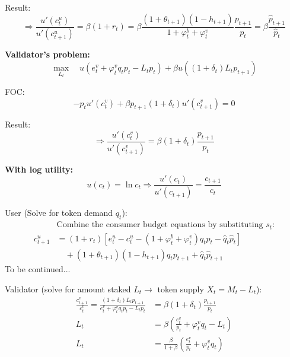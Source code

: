 \documentclass[./main.tex]{subfiles}
\begin{document}
Result:
\begin{equation}
    \Rightarrow \frac{u'(c_t^u)}{u'(c_{t+1}^u)} = \beta (1+r_t) 
    = \beta \frac{(1+\theta_{t+1})(1-h_{t+1})}{1+\varphi_t^b+\varphi_t^v} \frac{p_{t+1}}{p_t}
    = \beta \frac{\hat{p}_{t+1}}{\hat{p}_t}
\end{equation}

\noindent \textbf{Validator's problem:}
\begin{equation}
    \max_{L_t}\quad u(e_t^v + \varphi_t^v q_t p_t - L_t p_t) + \beta u((1+\delta_t) L_t p_{t+1})
\end{equation}

FOC:
\begin{equation}
    -p_t u'(c_t^v) + \beta p_{t+1} (1+\delta_t) u'(c_{t+1}^v) = 0
\end{equation}

Result:
\begin{equation}
    \Rightarrow \frac{u'(c_t^v)}{u'(c_{t+1}^v)} = \beta (1+\delta_t) \frac{p_{t+1}}{p_t}
\end{equation}

\noindent \textbf{With log utility:}
\begin{equation}
    u(c_t) = \ln c_t \Rightarrow \frac{u'(c_t)}{u'(c_{t+1})} = \frac{c_{t+1}}{c_t}
\end{equation}

User (Solve for token demand $q_t$):
\begin{align}
    &\text{Combine the consumer budget equations by substituting $s_t$:}\nonumber \\
    c_{t+1}^u &= (1+r_t) \left[e_t^u - c_t^u - (1+ \varphi_t^b+\varphi_t^v) q_t p_t - \hat{q}_t \hat{p}_t\right] \nonumber \\
    &\hspace{1em} + (1+\theta_{t+1})(1-h_{t+1}) q_t p_{t+1} + \hat{q}_t \hat{p}_{t+1}
\end{align}
To be continued...

Validator (solve for amount staked $L_t\rightarrow$ token supply $X_t=M_t-L_t$): 
\begin{align}
    \frac{c_{t+1}^v}{c_t^v} = \frac{(1+\delta_t) L_t p_{t+1}}{e_t^v + \varphi_t^v q_t p_t - L_t p_t} &= \beta (1+\delta_t) \frac{p_{t+1}}{p_t}\\
    L_t &= \beta (\frac{e_t^v}{p_t} + \varphi_t^v q_t - L_t)\\
    L_t &= \frac{\beta}{1+\beta} (\frac{e_t^v}{p_t} + \varphi_t^v q_t)
\end{align}
\end{document}
